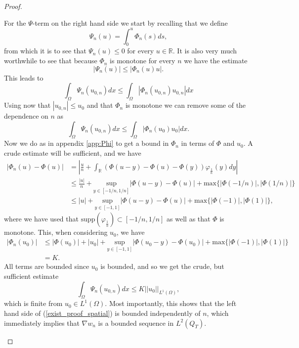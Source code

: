 \documentclass[11pt, a4paper]{article}
\begin{document}
\begin{proof}
\begin{description}
	For the $\Psi$-term on the right hand side we start by recalling that we define
	\begin{equation*}
	\Psi_n(u) = \int_0^{u}\Phi_n(s)ds,
	\end{equation*}
	from which it is to see that $\Psi_n(u) \leq 0$ for every $u \in \mathbb{R}$. It is also very much worthwhile to see that because $\Phi_n$ is monotone for every $n$ we have the estimate
	\begin{equation*}
	|\Psi_n(u)| \leq |\Phi_n(u)u|.
	\end{equation*}
	This leads to
	\begin{equation*}
	\int_\Omega \Psi_n(u_{0,n})dx \leq \int_\Omega |\Phi_n(u_{0,n})u_{0,n}|dx	
	\end{equation*}
	Using now that $|u_{0,n}| \leq u_0$ and that $\Phi_n$ is monotone we can remove some of the dependence on $n$ as
	\begin{equation*}
	\int_\Omega \Psi_n(u_{0,n})dx \leq \int_\Omega |\Phi_n(u_{0})u_{0}|dx.
	\end{equation*}
	Now we do as in appendix \ref{app:Phi} to get a bound in $\Phi_n$ in terms of $\Phi$ and $u_0$. A crude estimate will be sufficient, and we have
	\begin{align*}
	|\Phi_n(u) - \Phi(u)| &= \left|\frac{u}{n} + \int_\mathbb{R}\left( \Phi(u-y) - \Phi(u) - \Phi(y)\right)\varphi_{\frac{1}{n}}(y)dy \right| \\
	&\leq \frac{|u|}{n} + \underset{y\in [-1/n, 1/n]}{\mathrm{sup}}|\Phi(u-y) - \Phi(u)| + \mathrm{max}\{|\Phi(-1/n)|, |\Phi(1/n)|\} \\
	&\leq |u| + \underset{y\in [-1, 1]}{\mathrm{sup}}|\Phi(u-y) - \Phi(u)| +\mathrm{max}\{|\Phi(-1)|, |\Phi(1)|\},
	\end{align*}
	where we have used that $\mathrm{supp}(\varphi_{\frac{1}{n}})\subset [-1/n, 1/n]$ as well as that $\Phi$ is monotone. This, when considering $u_0$, we have
	\begin{align*}
	|\Phi_n(u_0)| &\leq |\Phi(u_0)| + |u_0| + \underset{y\in [-1, 1]}{\mathrm{sup}}|\Phi(u_0-y) - \Phi(u_0)| +\mathrm{max}\{|\Phi(-1)|, |\Phi(1)|\} \\
	&= K.
	\end{align*}
	All terms are bounded since $u_0$ is bounded, and so we get the crude, but sufficient estimate
	\begin{equation*}
	\int_\Omega \Psi_n(u_{0,n})dx \leq K ||u_0||_{L^1(\Omega)},
	\end{equation*}
	which is finite from $u_0 \in L^1(\Omega)$. Most importantly, this shows that the left hand side of (\ref{exist_proof_spatial}) is bounded independently of $n$, which immediately implies that $\nabla w_n$ is a bounded sequence in $L^2(Q_T)$.
	

\end{description}
\end{proof}
\end{document}
